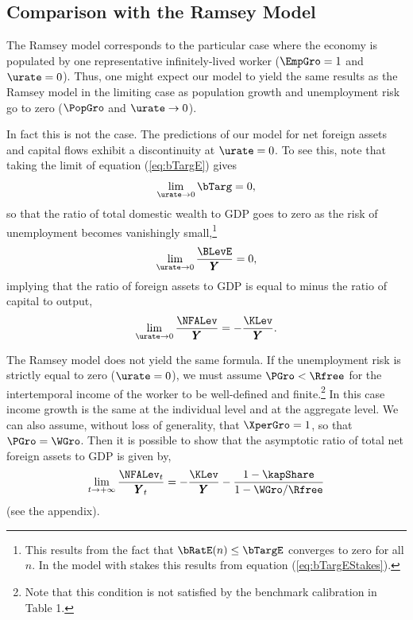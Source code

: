 \documentclass[titlepage]{\econtex}\newcommand{\texname}{cjSOE}
\renewcommand{\GDPLev}{\ensuremath{\pmb{Y}}}
\begin{document}
\medskip

\subsection{Comparison with the Ramsey Model}

The Ramsey model corresponds to the particular case where the economy is populated by one representative infinitely-lived worker ($\EmpGro=1$ and $\urate=0$). Thus, one might expect our model to yield the same results as the Ramsey model in the limiting case as population growth and unemployment risk go to zero ($\PopGro$ and $\urate \rightarrow 0$).

In fact this is not the case. The predictions of our model for net foreign assets and capital flows exhibit a discontinuity at $\urate=0$. To see this, note that taking the limit of equation (\ref{eq:bTargE}) gives
\begin{equation*}
\lim_{\urate \rightarrow 0} \bTarg=0,
\end{equation*}
so that the ratio of total domestic wealth to GDP goes to zero as the risk of unemployment becomes vanishingly small,\footnote{This results from the fact that $\bRatE(n) \leq \bTargE$ converges to zero for all $n$. In the model with stakes this results from equation (\ref{eq:bTargEStakes}). }
\begin{equation*}
\lim_{\urate \rightarrow 0} \frac{\BLevE}{\GDPLev}=0,
\end{equation*}
implying that the ratio of foreign assets to GDP is equal to minus the ratio of capital to output,
\begin{equation}
\lim_{\urate \rightarrow 0} \frac{\NFALev}{\GDPLev}=-\frac{\KLev}{\GDPLev}.
\label{eq:NFARatIfUGt0}
\end{equation}

The Ramsey model does not yield the same formula. If the unemployment risk is strictly equal to zero ($\urate=0$), we must assume $\PGro < \Rfree$ for the intertemporal income of the worker to be well-defined and finite.\footnote{Note that this condition is not satisfied by the benchmark calibration in Table 1.} In this case income growth is the same at the individual level and at the aggregate level. We can also assume, without loss of generality, that $\XperGro=1$, so that $\PGro=\WGro$. Then it is possible to show that the asymptotic ratio of total net foreign assets to GDP is given by,
\begin{equation}
\lim_{t \rightarrow +\infty} \frac{\NFALev_t}{\GDPLev_t}=-\frac{\KLev}{\GDPLev}-\frac{1-\kapShare}{1-\WGro/\Rfree}
\label{eq:NFARatIfUEq0}
\end{equation}
(see the appendix).
\end{document}
